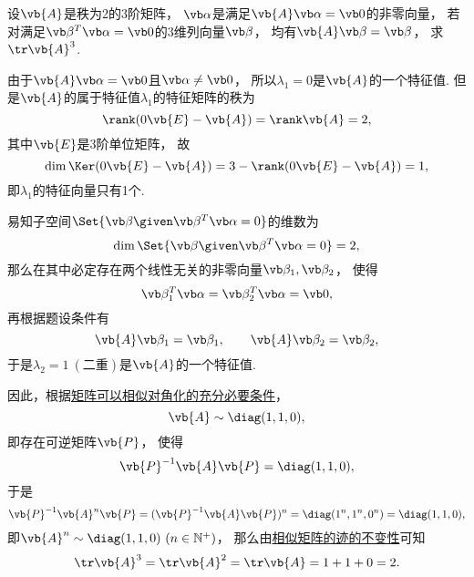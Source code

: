 \begin{example}
设\(\vb{A}\)是秩为2的3阶矩阵，
\(\vb\alpha\)是满足\(\vb{A} \vb\alpha = \vb0\)的非零向量，
若对满足\(\vb\beta^T \vb\alpha = \vb0\)的3维列向量\(\vb\beta\)，
均有\(\vb{A} \vb\beta = \vb\beta\)，
求\(\tr\vb{A}^3\).
\begin{solution}
由于\(\vb{A} \vb\alpha = \vb0\)且\(\vb\alpha \neq \vb0\)，
所以\(\lambda_1 = 0\)是\(\vb{A}\)的一个特征值.
但是\(\vb{A}\)的属于特征值\(\lambda_1\)的特征矩阵的秩为\[
	\rank(0\vb{E}-\vb{A})
	= \rank\vb{A}
	= 2,
\]
其中\(\vb{E}\)是3阶单位矩阵，
故\[
	\dim\Ker(0\vb{E}-\vb{A})
	= 3 - \rank(0\vb{E}-\vb{A})
	= 1,
\]
即\(\lambda_1\)的特征向量只有1个.

易知子空间\(\Set{\vb\beta \given \vb\beta^T \vb\alpha = 0}\)的维数为\[
	\dim\Set{\vb\beta \given \vb\beta^T \vb\alpha = 0} = 2,
\]
那么在其中必定存在两个线性无关的非零向量\(\vb\beta_1,\vb\beta_2\)，
使得\begin{equation*}
	\vb\beta_1^T \vb\alpha
	= \vb\beta_2^T \vb\alpha
	= \vb0,
\end{equation*}
再根据题设条件有\[
	\vb{A}\vb\beta_1 = \vb\beta_1,
	\qquad
	\vb{A}\vb\beta_2 = \vb\beta_2,
\]
于是\(\lambda_2 = 1\ (\text{二重})\)是\(\vb{A}\)的一个特征值.

因此，根据\hyperref[theorem:矩阵相似对角化.矩阵可以相似对角化的充分必要条件]{矩阵可以相似对角化的充分必要条件}，\begin{equation*}
	\vb{A} \sim \diag(1,1,0),
\end{equation*}
即存在可逆矩阵\(\vb{P}\)，
使得\[
	\vb{P}^{-1} \vb{A} \vb{P}
	= \diag(1,1,0),
\]
于是\[
	\vb{P}^{-1} \vb{A}^n \vb{P}
	= (\vb{P}^{-1} \vb{A} \vb{P})^n
	= \diag(1^n,1^n,0^n)
	= \diag(1,1,0),
\]
即\(\vb{A}^n \sim \diag(1,1,0)\ (n\in\mathbb{N}^+)\)，
那么由\hyperref[theorem:特征值与特征向量.相似矩阵的迹的不变性]{相似矩阵的迹的不变性}可知\[
	\tr\vb{A}^3
	= \tr\vb{A}^2
	= \tr\vb{A}
	= 1+1+0
	= 2.
\]
\end{solution}
\end{example}

